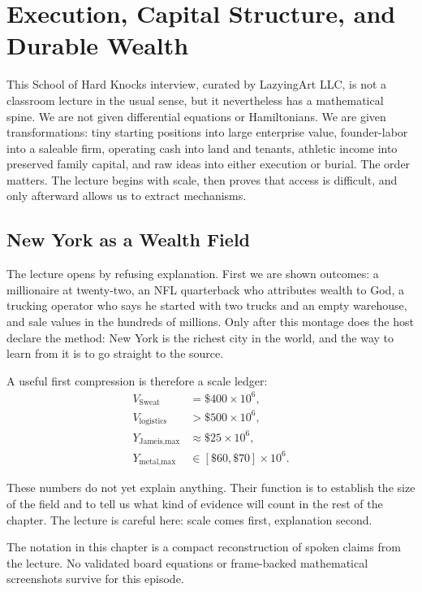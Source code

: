 \chapter{Execution, Capital Structure, and Durable Wealth}

This School of Hard Knocks interview, curated by LazyingArt LLC, is not a classroom lecture in the usual sense, but it nevertheless has a mathematical spine. We are not given differential equations or Hamiltonians. We are given transformations: tiny starting positions into large enterprise value, founder-labor into a saleable firm, operating cash into land and tenants, athletic income into preserved family capital, and raw ideas into either execution or burial. The order matters. The lecture begins with scale, then proves that access is difficult, and only afterward allows us to extract mechanisms.

\section{New York as a Wealth Field}

The lecture opens by refusing explanation. First we are shown outcomes: a millionaire at twenty-two, an NFL quarterback who attributes wealth to God, a trucking operator who says he started with two trucks and an empty warehouse, and sale values in the hundreds of millions. Only after this montage does the host declare the method: New York is the richest city in the world, and the way to learn from it is to go straight to the source.

A useful first compression is therefore a scale ledger:
\begin{align}
V_{\text{Sweat}}&=\$400\times 10^6,\\
V_{\text{logistics}}&>\$500\times 10^6,\\
Y_{\text{Jameis,max}}&\approx \$25\times 10^6,\\
Y_{\text{metal,max}}&\in [\$60,\$70]\times 10^6.
\end{align}

These numbers do not yet explain anything. Their function is to establish the size of the field and to tell us what kind of evidence will count in the rest of the chapter. The lecture is careful here: scale comes first, explanation second.

\begin{remark}
The notation in this chapter is a compact reconstruction of spoken claims from the lecture. No validated board equations or frame-backed mathematical screenshots survive for this episode.
\end{remark}

